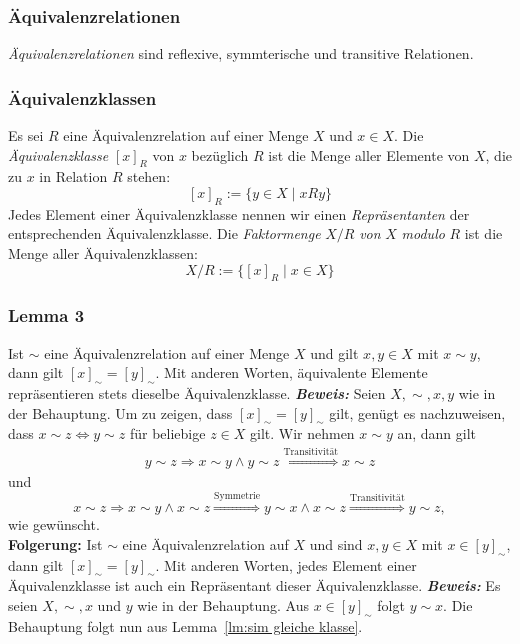 \subsubsection{Äquivalenzrelationen}%
\label{ssub:äquivalenzrelationen}
\textit{Äquivalenzrelationen} sind reflexive, symmterische und transitive Relationen.

\subsubsection{Äquivalenzklassen}%
\label{ssub:äquivalenzklassen}
Es sei $R$ eine Äquivalenzrelation auf einer Menge $X$ und $x\in X$. Die \textit{Äquivalenzklasse} $[x]_R$ von $x$ bezüglich $R$ ist die Menge aller Elemente von $X$, die zu $x$ in Relation $R$ stehen:
    \[
    [x]_R:=\{y\in X\mid xRy \}
    \]
    Jedes Element einer Äquivalenzklasse nennen wir einen \textit{Repräsentanten} der entsprechenden Äquivalenzklasse.
    Die \textit{Faktormenge} $X/R$ \textit{von} $X$ \textit{modulo} $R$ ist die Menge aller Äquivalenzklassen:
    \[
    X/R:=\big\{ [x]_R\mid x\in X \big\}
    \]

\subsubsection{Lemma 3}%
\label{ssub:lemma_3}
Ist $\sim $ eine Äquivalenzrelation auf einer Menge $X$ und gilt $x,y\in X$ mit $x\sim y$, dann gilt $[x]_\sim=[y]_\sim$. Mit anderen Worten, äquivalente Elemente repräsentieren stets dieselbe Äquivalenzklasse.
\textbf{\textit{Beweis: }} 
Seien $X,\sim,x,y$ wie in der Behauptung. Um zu zeigen, dass $[x]_\sim=[y]_\sim$ gilt, genügt es nachzuweisen, dass $x\sim z\Leftrightarrow y\sim z$ für beliebige $z\in X$ gilt. Wir nehmen $x\sim y$ an, dann gilt
    \begin{align*}
    y\sim z\Rightarrow x\sim y\land y\sim z \stackrel{\text{Transitivität}}{\Longrightarrow} x\sim z
    \end{align*}
    und
    \[
    x\sim z\Rightarrow x\sim y\land x\sim z\stackrel{\text{Symmetrie}}{\Longrightarrow} y\sim x\land x\sim z\stackrel{\text{Transitivität}}{\Longrightarrow} y\sim z,
    \]
    wie gewünscht. \\
\textbf{Folgerung: } 
Ist $\sim $ eine Äquivalenzrelation auf $X$ und sind $x,y\in X$ mit $x\in[y]_\sim$, dann gilt $[x]_\sim=[y]_\sim$. Mit anderen Worten, jedes Element einer Äquivalenzklasse ist auch ein Repräsentant dieser Äquivalenzklasse.
\textbf{\textit{Beweis: }}
Es seien $X,\sim,x$ und $y$ wie in der Behauptung. Aus $x\in[y]_\sim$ folgt $y\sim x$. Die Behauptung folgt nun aus Lemma~\ref{lm:sim gleiche klasse}.

